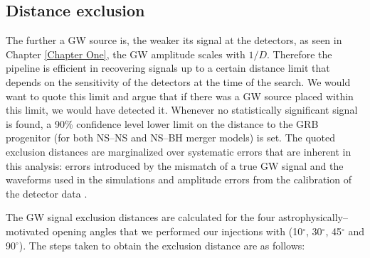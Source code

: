 \subsection{Distance exclusion}
The further a GW source is, the weaker its signal at the detectors, as seen in Chapter \ref{Chapter One}, the GW amplitude scales with $1/D$. Therefore the pipeline is efficient in recovering signals up to a certain distance limit that depends on the sensitivity of the detectors at the time of the search. We would want to quote this limit and argue that if there was a GW source placed within this limit, we would have detected it. Whenever no statistically significant signal is found, a 90\% confidence level lower limit on the distance to the GRB progenitor (for both NS--NS and NS--BH merger models) is set. The quoted exclusion distances are marginalized over systematic errors that are inherent in this analysis: errors introduced by the mismatch of a true GW signal and the waveforms used in the simulations \cite{Abbott:2009tt} and amplitude errors from the calibration of the detector data \cite{Abadie:2010px}.

The GW signal exclusion distances are calculated for the four astrophysically--motivated opening angles that we performed our injections with (10$^\circ$, 30$^\circ$, 45$^\circ$ and 90$^\circ$). The steps taken to obtain the exclusion distance are as follows:

